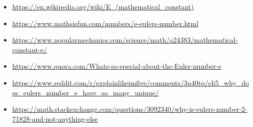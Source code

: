 \documentclass[12pt]{report}
\begin{document}

\par


\vspace{\baselineskip}

\vspace{\baselineskip}

\vspace{\baselineskip}

\vspace{\baselineskip}

\vspace{\baselineskip}

\vspace{\baselineskip}
\begin{itemize}
	\item \href{https://en.wikipedia.org/wiki/E_(mathematical_constant)}{https://en.wikipedia.org/wiki/E\_(mathematical\_constant)}\par

	\item \href{https://www.mathsisfun.com/numbers/e-eulers-number.html}{https://www.mathsisfun.com/numbers/e-eulers-number.html}\par

	\item \href{https://www.popularmechanics.com/science/math/a24383/mathematical-constant-e/}{https://www.popularmechanics.com/science/math/a24383/mathematical-constant-e/}\par

	\item \href{https://www.quora.com/Whats-so-special-about-the-Euler-number-e}{https://www.quora.com/Whats-so-special-about-the-Euler-number-e}\par

	\item \href{https://www.reddit.com/r/explainlikeimfive/comments/3u40tp/eli5_why_does_eulers_number_e_have_so_many_unique/}{https://www.reddit.com/r/explainlikeimfive/comments/3u40tp/eli5\_why\_does\_eulers\_number\_e\_have\_so\_many\_unique/}\par

	\item \href{https://math.stackexchange.com/questions/3092340/why-is-eulers-number-2-71828-and-not-anything-else}{https://math.stackexchange.com/questions/3092340/why-is-eulers-number-2-71828-and-not-anything-else}
\end{itemize}\par


\vspace{\baselineskip}
\end{document}
